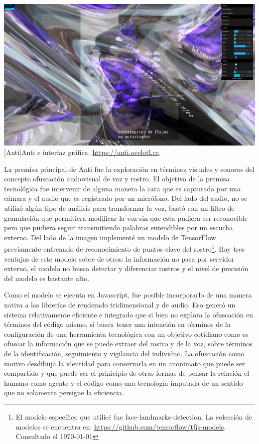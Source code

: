 \begin{Figure}
\includegraphics[width=\columnwidth]{../img/anti01.png}
[Anti]{Anti e interfaz gráfica. \url{https://anti.ocelotl.cc}.} %
\label{fig:gallery} 
\end{Figure}

  La premisa principal de Anti fue la exploración en términos visuales y sonoros del concepto ofuscación audiovisual de voz y rostro. El objetivo de la premisa tecnológica fue intervenir de alguna manera la cara que es capturada por una cámara y el audio que es registrado por un micrófono. Del lado del audio, no se utilizó algún tipo de análisis para transformar la voz, bastó con un filtro de granulación que permitiera modificar la voz sin que esta pudiera ser reconocible pero que pudiera seguir transmitiendo palabras entendibles por un escucha externo. Del lado de la imagen implementé un modelo de TensorFlow previamente entrenado de reconocimiento de puntos clave del rostro\footnote{El modelo específico que utilicé fue face-landmarks-detection. La colección de modelos se encuentra en: \url{https://github.com/tensorflow/tfjs-models}. Consultado el \today}. Hay tres ventajas de este modelo sobre de otros: la información no pasa por servidor externo, el modelo no busca detectar y diferenciar rostros y el nivel de precisión del modelo es bastante alto\citep{kartynnik2019realtime}.

  Como el modelo se ejecuta en Javascript, fue posible incorporarlo de una manera nativa a las librerías de renderado tridimensional y de audio. Eso generó un sistema relativamente eficiente e integrado que si bien no explora la ofuscación en términos del código mismo, si busca tener una intención en términos de la configuración de una herramienta tecnológica con un objetivo cotidiano como es ofuscar la información que se puede extraer del rostro y de la voz, sobre términos de la identificación, seguimiento y vigilancia del individuo. La ofuscación como motivo desdibuja la identidad para conservarla en un anonimato que puede ser compartido y que puede ser el prinicipio de otras formas de pensar la relación el humano como agente y el código como una tecnología imputada de un sentido que no solamente persigue la eficiencia.  

